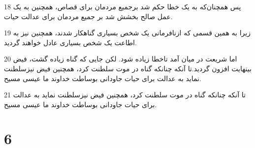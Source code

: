 \par 18 پس همچنان‌که به یک خطا حکم شد برجمیع مردمان برای قصاص، همچنین به یک عمل صالح بخشش شد بر جمیع مردمان برای عدالت حیات.
\par 19 زیرا به همین قسمی که ازنافرمانی یک شخص بسیاری گناهکار شدند، همچنین نیز به اطاعت یک شخص بسیاری عادل خواهند گردید.
\par 20 اما شریعت در میان آمد تاخطا زیاده شود. لکن جایی که گناه زیاده گشت، فیض بینهایت افزون گردید.تا آنکه چنانکه گناه در موت سلطنت کرد، همچنین فیض نیزسلطنت نماید به عدالت برای حیات جاودانی بوساطت خداوند ما عیسی مسیح.
\par 21 تا آنکه چنانکه گناه در موت سلطنت کرد، همچنین فیض نیزسلطنت نماید به عدالت برای حیات جاودانی بوساطت خداوند ما عیسی مسیح.

\chapter{6}

